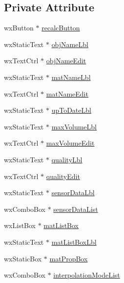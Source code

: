 \subsection*{Private Attribute}
\begin{DoxyCompactItemize}
\item 
wx\-Button $\ast$ \hyperlink{classPropertiesBox_a0f5356371cde511efeb413bc2a98e6fc}{recalc\-Button}
\item 
wx\-Static\-Text $\ast$ \hyperlink{classPropertiesBox_ac281563a94d4cdffd51084d88cafc692}{obj\-Name\-Lbl}
\item 
wx\-Text\-Ctrl $\ast$ \hyperlink{classPropertiesBox_a7bb26289d5da39d7996c794216f4d89b}{obj\-Name\-Edit}
\item 
wx\-Static\-Text $\ast$ \hyperlink{classPropertiesBox_ae07827304c19b4e71532fed5a4c65bb0}{mat\-Name\-Lbl}
\item 
wx\-Text\-Ctrl $\ast$ \hyperlink{classPropertiesBox_aba989cc01ddce5251f021419bfe3408f}{mat\-Name\-Edit}
\item 
wx\-Static\-Text $\ast$ \hyperlink{classPropertiesBox_acd0a5ccaa4e981b961685c5714e67f92}{up\-To\-Date\-Lbl}
\item 
wx\-Static\-Text $\ast$ \hyperlink{classPropertiesBox_ac37df12581fc6f63aa87b2807d62fdb5}{max\-Volume\-Lbl}
\item 
wx\-Text\-Ctrl $\ast$ \hyperlink{classPropertiesBox_ab738d2ef986a20be47a86bb676ae11db}{max\-Volume\-Edit}
\item 
wx\-Static\-Text $\ast$ \hyperlink{classPropertiesBox_ad5339a1b07ae669a349478cf5c3b0fde}{quality\-Lbl}
\item 
wx\-Text\-Ctrl $\ast$ \hyperlink{classPropertiesBox_ab01869f0f594e103ea5698a480696b99}{quality\-Edit}
\item 
wx\-Static\-Text $\ast$ \hyperlink{classPropertiesBox_ab9b6df8a3367b4b5b56ef82ab1bd7aa3}{sensor\-Data\-Lbl}
\item 
wx\-Combo\-Box $\ast$ \hyperlink{classPropertiesBox_afc9329945c39f48e441c410b0ff3d9fa}{sensor\-Data\-List}
\item 
wx\-List\-Box $\ast$ \hyperlink{classPropertiesBox_affd4774a26bd75a30c1d1c07d02edd18}{mat\-List\-Box}
\item 
wx\-Static\-Text $\ast$ \hyperlink{classPropertiesBox_aa08a220302b1d89a196dc7e03a390bd6}{mat\-List\-Box\-Lbl}
\item 
wx\-Static\-Box $\ast$ \hyperlink{classPropertiesBox_a1ff3669bf863d80a26d2d9874b1868e1}{mat\-Prop\-Box}
\item 
wx\-Combo\-Box $\ast$ \hyperlink{classPropertiesBox_a3f5165a466fd9204f758a6fbb17507ae}{interpolation\-Mode\-List}

\end{DoxyCompactItemize}
